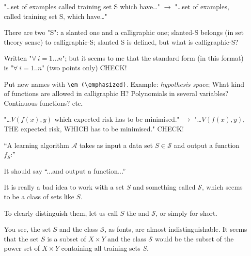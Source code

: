 \begin{description}[style=unboxed,leftmargin=0cm,itemsep=3ex]
\vspace{1ex}
"\dots set of examples called training set S which have\dots"
\quad$\longrightarrow$\quad
"\dots set of examples, called training set S, which have\dots"

\vspace{1ex}\quad
There are two "S": a slanted one and a calligraphic one; 
slanted-S belongs (in set theory sense) to calligraphic-S; 
slanted S is defined, but what is calligraphic-S?

\vspace{1ex}\quad
Written "$\forall\ i=1...n$"; but it seems to me that the standard
form (in this format) is "$\forall\ i=1..n$" (two points only) CHECK!

\vspace{1ex}\quad Put new names with 
\verb!\em (\emphasized)!.
Example: {\em hypothesis space}; 
What kind of functions are allowed in calligraphic H? 
Polynomials in several variables? 
Continuous functions? etc.

\vspace{1ex}\quad 
"\dots $V(f(x),y)$ which expected risk has to be minimised."
\quad$\longrightarrow$\quad
"\dots $V(f(x),y)$, THE expected risk, WHICH has to be minimised." CHECK!

\vspace{1ex}

``A learning algorithm $\mathcal{A}$ takes as input a data set
$S\in\mathcal{S}$ and output a function $f_S$:''

It should say ``...and output a function...''


It is really a bad idea to work with a set $S$ and something
called $\mathcal{S}$, which seems to be a class of sets like $S$.

To clearly distinguish them, let us call $S$ the  and
$\mathcal{S}$,  or simply
 for short.

You see, the set $S$ and the class $\mathcal{S}$, as fonts, are almost
indistinguishable.
It seems that the set $S$ is a subset of $X\times Y$ and the class
$\mathcal{S}$ would be the subset of the power set of $X\times Y$
containing all training sets $S$.


\end{description}
